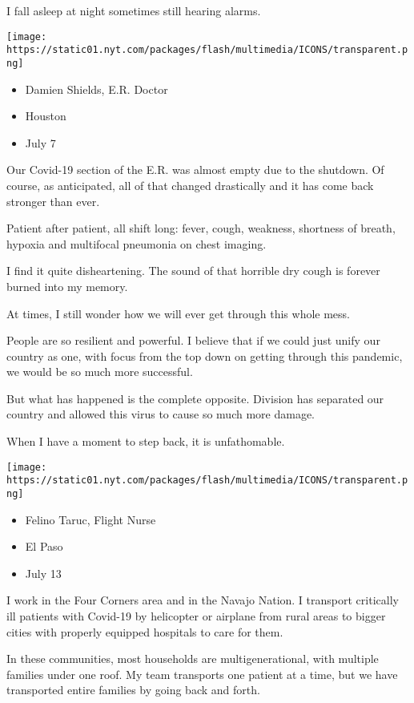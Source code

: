 I fall asleep at night sometimes still hearing alarms.

\texttt{[image: https://static01.nyt.com/packages/flash/multimedia/ICONS/transparent.png]}

\begin{itemize}
\tightlist
\item
  Damien Shields, E.R. Doctor
\item
  Houston
\item
  July 7
\end{itemize}

Our Covid-19 section of the E.R. was almost empty due to the shutdown.
Of course, as anticipated, all of that changed drastically and it has
come back stronger than ever.

Patient after patient, all shift long: fever, cough, weakness, shortness
of breath, hypoxia and multifocal pneumonia on chest imaging.

I find it quite disheartening. The sound of that horrible dry cough is
forever burned into my memory.

At times, I still wonder how we will ever get through this whole mess.

People are so resilient and powerful. I believe that if we could just
unify our country as one, with focus from the top down on getting
through this pandemic, we would be so much more successful.

But what has happened is the complete opposite. Division has separated
our country and allowed this virus to cause so much more damage.

When I have a moment to step back, it is unfathomable.

\texttt{[image: https://static01.nyt.com/packages/flash/multimedia/ICONS/transparent.png]}

\begin{itemize}
\tightlist
\item
  Felino Taruc, Flight Nurse
\item
  El Paso
\item
  July 13
\end{itemize}

I work in the Four Corners area and in the Navajo Nation. I transport
critically ill patients with Covid-19 by helicopter or airplane from
rural areas to bigger cities with properly equipped hospitals to care
for them.

In these communities, most households are multigenerational, with
multiple families under one roof. My team transports one patient at a
time, but we have transported entire families by going back and forth.

